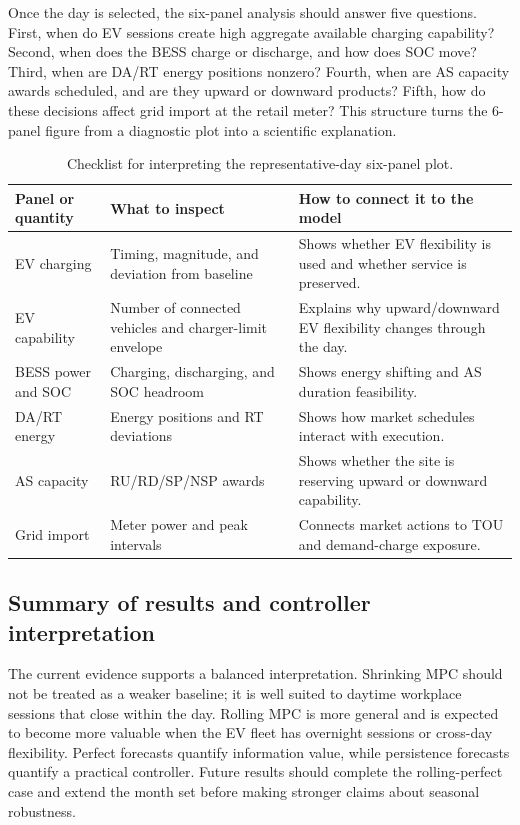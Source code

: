 \documentclass[final,5p,times]{elsarticle}
\begin{document}
Once the day is selected, the six-panel analysis should answer five questions. First, when do EV sessions create high aggregate available charging capability? Second, when does the BESS charge or discharge, and how does SOC move? Third, when are DA/RT energy positions nonzero? Fourth, when are AS capacity awards scheduled, and are they upward or downward products? Fifth, how do these decisions affect grid import at the retail meter? This structure turns the 6-panel figure from a diagnostic plot into a scientific explanation.

\begin{table}[!t]
\centering
\caption{Checklist for interpreting the representative-day six-panel plot.}
\label{tab:repday_checklist}
\scriptsize
\begin{tabularx}{\textwidth}{@{}p{}p{}X@{}}
\toprule
Panel or quantity & What to inspect & How to connect it to the model \\
\midrule
EV charging & Timing, magnitude, and deviation from baseline & Shows whether EV flexibility is used and whether service is preserved.\\
EV capability & Number of connected vehicles and charger-limit envelope & Explains why upward/downward EV flexibility changes through the day.\\
BESS power and SOC & Charging, discharging, and SOC headroom & Shows energy shifting and AS duration feasibility.\\
DA/RT energy & Energy positions and RT deviations & Shows how market schedules interact with execution.\\
AS capacity & RU/RD/SP/NSP awards & Shows whether the site is reserving upward or downward capability.\\
Grid import & Meter power and peak intervals & Connects market actions to TOU and demand-charge exposure.\\
\bottomrule
\end{tabularx}
\end{table}

\subsection{Summary of results and controller interpretation}
The current evidence supports a balanced interpretation. Shrinking MPC should not be treated as a weaker baseline; it is well suited to daytime workplace sessions that close within the day. Rolling MPC is more general and is expected to become more valuable when the EV fleet has overnight sessions or cross-day flexibility. Perfect forecasts quantify information value, while persistence forecasts quantify a practical controller. Future results should complete the rolling-perfect case and extend the month set before making stronger claims about seasonal robustness.
\end{document}
